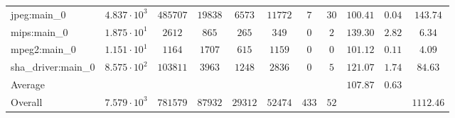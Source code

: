 \begin{tabular}{|l|c|c|c|c|c|c|c|c|c|c|}
jpeg:main\_0            & $ 4.837 \cdot 10^{3}  $ & $ 485707 $ & $ 19838 $ & $ 6573  $ & $ 11772 $ & $ 7   $ & $ 30 $ & $ 100.41      $ & $ 0.04    $ & $ 143.74  $ \\
mips:main\_0            & $ 1.875 \cdot 10^{1}  $ & $ 2612   $ & $ 865   $ & $ 265   $ & $ 349   $ & $ 0   $ & $ 2  $ & $ 139.30      $ & $ 2.82    $ & $ 6.34    $ \\
mpeg2:main\_0           & $ 1.151 \cdot 10^{1}  $ & $ 1164   $ & $ 1707  $ & $ 615   $ & $ 1159  $ & $ 0   $ & $ 0  $ & $ 101.12      $ & $ 0.11    $ & $ 4.09    $ \\
sha\_driver:main\_0     & $ 8.575 \cdot 10^{2}  $ & $ 103811 $ & $ 3963  $ & $ 1248  $ & $ 2836  $ & $ 0   $ & $ 5  $ & $ 121.07      $ & $ 1.74    $ & $ 84.63   $ \\
\hline
Average                 & $                     $ & $        $ & $       $ & $       $ & $       $ & $     $ & $    $ & $ 107.87      $ & $ 0.63    $ & $         $ \\
\hline
Overall                 & $ 7.579 \cdot 10^{3}  $ & $ 781579 $ & $ 87932 $ & $ 29312 $ & $ 52474 $ & $ 433 $ & $ 52 $ & $             $ & $         $ & $ 1112.46 $ \\
\hline
\end{tabular}
